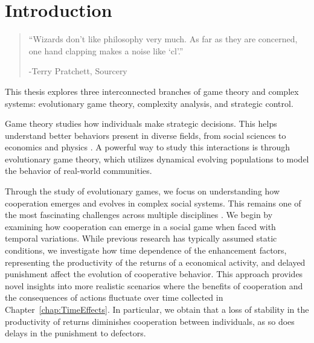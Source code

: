 \chapter{Introduction}
\label{chap:Intro}

\begin{quotation}

\vspace{-3cm}

\begin{flushright}
\begin{minipage}[t][5cm][b]{0.5\textwidth}
{ ``Wizards don’t like philosophy very much. As far as they are concerned, one hand clapping makes a noise like `cl'.''}

\bigskip

-{\small  Terry Pratchett, Sourcery }
\end{minipage}
\end{flushright}

\vspace{0.5cm}

\end{quotation}



This thesis explores three interconnected branches of game theory and complex systems: evolutionary game theory, complexity analysis, and strategic control. 

Game theory studies how individuals make strategic decisions. This helps understand better behaviors present in diverse fields, from social sciences to economics and physics \cite{Social,EconomyGames,GamesComplex}. A powerful way to study this interactions is through evolutionary game theory, which utilizes dynamical evolving populations to model the behavior of real-world communities. 

Through the study of evolutionary games, we focus on understanding how cooperation emerges and evolves in complex social systems. This remains one of the most fascinating challenges across multiple disciplines \cite{SocialPhy}. We begin by examining how cooperation can emerge in a social game when faced with temporal variations.  While previous research has typically assumed static conditions, we investigate how time dependence of the enhancement factors, representing the productivity of the returns of a economical activity, and delayed punishment affect the evolution of cooperative behavior. This approach provides novel insights into more realistic scenarios where the benefits of cooperation and the consequences of actions fluctuate over time collected in Chapter~\ref{chap:TimeEffects}. In particular, we obtain that a loss of stability in the productivity of returns diminishes cooperation between individuals, as so does delays in the punishment to defectors.

